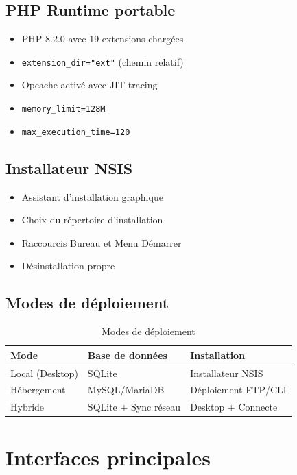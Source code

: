 \documentclass[12pt,a4paper,twoside]{report}
\begin{document}
\subsection{PHP Runtime portable}

\begin{itemize}
    \item PHP 8.2.0 avec 19 extensions chargées
    \item \texttt{extension\_dir="ext"} (chemin relatif)
    \item Opcache activé avec JIT tracing
    \item \texttt{memory\_limit=128M}
    \item \texttt{max\_execution\_time=120}
\end{itemize}

\subsection{Installateur NSIS}

\begin{itemize}
    \item Assistant d'installation graphique
    \item Choix du répertoire d'installation
    \item Raccourcis Bureau et Menu Démarrer
    \item Désinstallation propre
\end{itemize}

\subsection{Modes de déploiement}

\begin{table}[h]
\centering
\caption{Modes de déploiement}
\begin{tabular}{lll}
\toprule
Mode & Base de données & Installation \\
\midrule
Local (Desktop) & SQLite & Installateur NSIS \\
Hébergement & MySQL/MariaDB & Déploiement FTP/CLI \\
Hybride & SQLite + Sync réseau & Desktop + Connecte \\
\bottomrule
\end{tabular}
\end{table}

\section{Interfaces principales}
\end{document}
